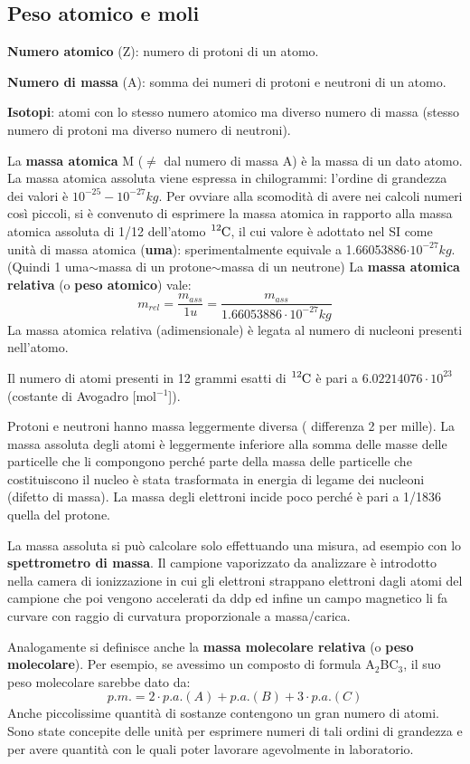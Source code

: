 \subsection{Peso atomico e moli}
\textbf{Numero atomico} (Z): numero di protoni di un atomo.

\textbf{Numero di massa} (A): somma dei numeri di protoni e neutroni di un
atomo.

\textbf{Isotopi}: atomi con lo stesso numero atomico ma diverso numero di
massa (stesso numero di protoni ma diverso numero di neutroni).

La \textbf{massa atomica} M ($\neq$ dal numero di massa A) è la massa di un dato atomo. La massa atomica assoluta viene espressa in chilogrammi: l'ordine di grandezza dei valori è $10^{-25}-10^{-27} kg$. Per ovviare alla scomodità di avere nei calcoli numeri così piccoli, si è convenuto di esprimere la
massa atomica in rapporto alla massa atomica assoluta di 1/12 dell'atomo \(\ce{ ^{12}C }\), il cui valore è adottato nel SI come unità di massa atomica (\textbf{uma}): sperimentalmente equivale a 1.66053886$\cdot
10^{-27} kg$. (Quindi 1 uma$\sim$massa di un protone$\sim$massa di un neutrone)
La \textbf{massa atomica relativa} (o \textbf{peso atomico}) vale:
$$m_{rel}=\frac{m_{ass}}{1 u}=\frac{m_{ass}}{1.66053886\cdot
10^{-27} kg}$$
La massa atomica relativa (adimensionale) è legata al numero di nucleoni presenti nell'atomo.

Il numero di atomi presenti in 12 grammi esatti di \(\ce{ ^{12}C }\) è pari a $6.02214076\cdot10^{23}$ (costante di Avogadro [mol$^{-1}$]).

Protoni e neutroni hanno massa leggermente diversa ( differenza 2 per mille). La massa assoluta degli atomi è leggermente inferiore alla somma delle masse delle particelle che li compongono perché parte della massa delle particelle che costituiscono il nucleo è stata trasformata in energia di legame dei nucleoni (difetto di massa).
La massa degli elettroni incide poco perché è pari a 1/1836 quella del protone.

La massa assoluta si può calcolare solo effettuando una misura, ad esempio con lo \textbf{spettrometro di massa}. Il campione vaporizzato da analizzare è introdotto nella camera di ionizzazione in cui gli elettroni strappano elettroni dagli atomi del campione che poi vengono accelerati da ddp ed infine un campo magnetico li fa curvare con raggio di curvatura proporzionale a massa/carica.

Analogamente si definisce anche la \textbf{massa molecolare relativa} (o \textbf{peso molecolare}). Per esempio, se avessimo un composto di formula A$_2$BC$_3$, il suo peso molecolare sarebbe dato da:
$$p.m.= 2\cdot p.a.(A) + p.a.(B)+ 3\cdot p.a.(C)$$
Anche piccolissime quantità di sostanze contengono un gran numero di atomi.
Sono state concepite delle unità per esprimere numeri di tali ordini di grandezza e per avere quantità con le quali poter lavorare agevolmente in laboratorio.

